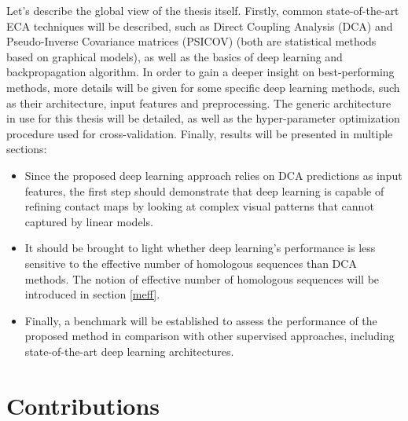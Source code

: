     Let's describe the global view of the thesis itself.
    Firstly, common state-of-the-art ECA techniques will be described, such as Direct Coupling Analysis (DCA)
    and Pseudo-Inverse Covariance matrices (PSICOV) (both are statistical methods based on graphical models),
    as well as the basics of deep learning and backpropagation algorithm.
    In order to gain a deeper insight on best-performing methods, more details will be given for
    some specific deep learning methods, such as their architecture, input features and preprocessing.
    The generic architecture in use for this thesis will be detailed, as well as the hyper-parameter
    optimization procedure used for cross-validation.
    Finally, results will be presented in multiple sections:
    \begin{itemize}
        \item Since the proposed deep learning approach relies on DCA predictions as input features,
        the first step should demonstrate that deep learning is capable of refining
        contact maps by looking at complex visual patterns that cannot captured by linear models.
        \item It should be brought to light whether deep learning's performance is less sensitive to the effective
        number of homologous sequences than DCA methods. The notion of effective number of homologous sequences
        will be introduced in section \ref{meff}.
        \item Finally, a benchmark will be established to assess the performance of the proposed method
        in comparison with other supervised approaches, including state-of-the-art deep learning architectures.
    \end{itemize}

\section{Contributions}

    
